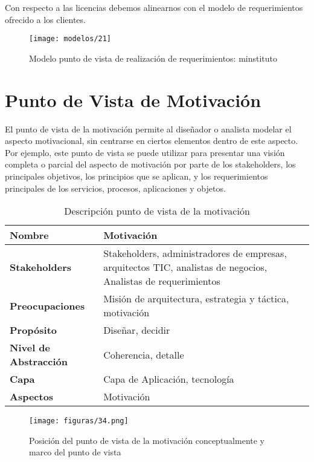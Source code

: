    Con respecto a las licencias debemos alinearnos con el modelo de requerimientos ofrecido a los clientes.

   \begin{figure}[H]
   	\centering
   	\texttt{[image: modelos/21]}
   	\captionsetup{width=.95\textwidth}
   	\caption{Modelo punto de vista de realización de requerimientos: minstituto}
   	\label{modelo21}
   \end{figure}
   
\section{Punto de Vista de Motivación}
El punto de vista de la motivación permite al diseñador o analista modelar el aspecto motivacional, sin centrarse en ciertos elementos dentro de este aspecto. Por ejemplo, este punto de vista se puede utilizar para presentar una visión completa o parcial del aspecto de motivación por parte de los stakeholders, los principales objetivos, los principios que se aplican, y los requerimientos principales de los servicios, procesos, aplicaciones y objetos.

   \begin{table}[H]
   	\centering
   	\begin{tabular}{lp{8cm}}
   		\toprule
   		\textbf{Nombre} & \textbf{Motivación} \\
   		\midrule
   		\textbf{Stakeholders} & Stakeholders, administradores de empresas, arquitectos TIC, analistas de negocios, Analistas de requerimientos \\
   		\textbf{Preocupaciones} & Misión de arquitectura, estrategia y táctica, motivación \\
   		\textbf{Propósito} & Diseñar, decidir \\
   		\textbf{Nivel de Abstracción} & Coherencia, detalle \\
   		\textbf{Capa} & Capa de Aplicación, tecnología \\
   		\textbf{Aspectos} & Motivación \\
   		\bottomrule
   	\end{tabular}
   	\captionsetup{width=.95\textwidth}
   	\caption{Descripción punto de vista de la motivación}
   	\label{tabla25}
   \end{table}
   
   \begin{figure}[H]
   	\centering
   	\texttt{[image: figuras/34.png]}
   	\captionsetup{width=.95\textwidth}
   	\caption{Posición del punto de vista de la motivación conceptualmente y marco del punto de vista}
   	\label{figura34}
   \end{figure}
   
